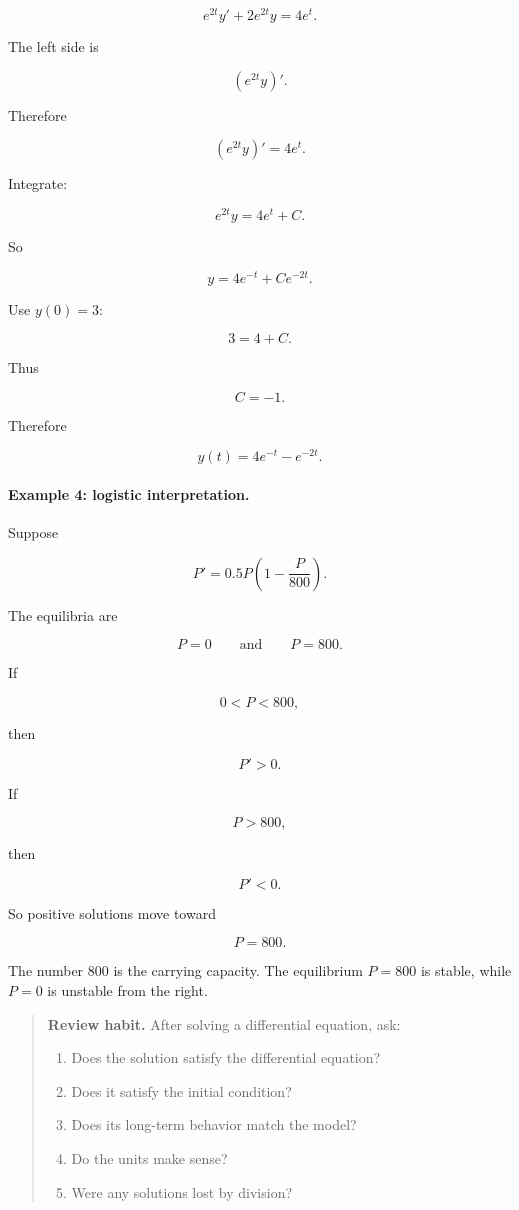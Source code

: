 \[
e^{2t}y'+2e^{2t}y=4e^t.
\]

The left side is

\[
(e^{2t}y)'.
\]

Therefore

\[
(e^{2t}y)'=4e^t.
\]

Integrate:

\[
e^{2t}y=4e^t+C.
\]

So

\[
y=4e^{-t}+Ce^{-2t}.
\]

Use \(y(0)=3\):

\[
3=4+C.
\]

Thus

\[
C=-1.
\]

Therefore

\[
\boxed{
y(t)=4e^{-t}-e^{-2t}.
}
\]

\paragraph{Example 4: logistic interpretation.}
Suppose

\[
P'=0.5P\left(1-\frac{P}{800}\right).
\]

The equilibria are

\[
P=0
\qquad\text{and}\qquad
P=800.
\]

If

\[
0<P<800,
\]

then

\[
P'>0.
\]

If

\[
P>800,
\]

then

\[
P'<0.
\]

So positive solutions move toward

\[
P=800.
\]

The number \(800\) is the carrying capacity.  The equilibrium \(P=800\) is stable, while
\(P=0\) is unstable from the right.

\begin{quote}
\textbf{Review habit.}
After solving a differential equation, ask:

\begin{enumerate}
\item Does the solution satisfy the differential equation?

\item Does it satisfy the initial condition?

\item Does its long-term behavior match the model?

\item Do the units make sense?

\item Were any solutions lost by division?
\end{enumerate}
\end{quote}

